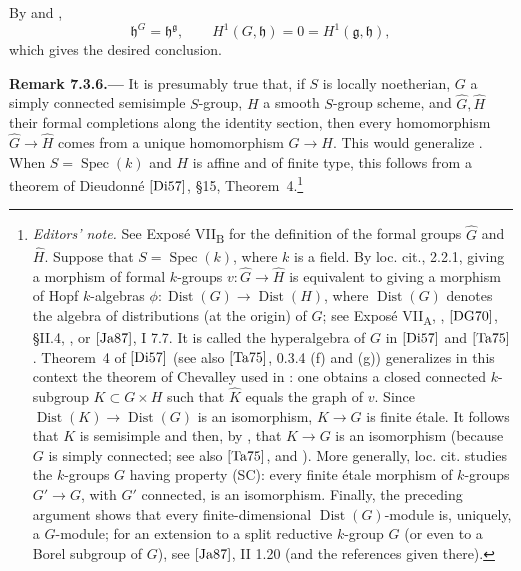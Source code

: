 By  and ,
\[
  \mathfrak h^G=\mathfrak h^{\mathfrak g},
  \qquad
  H^1(G,\mathfrak h)=0=H^1(\mathfrak g,\mathfrak h),
\]
which gives the desired conclusion.

\par\medskip\noindent{}\textbf{Remark 7.3.6.---}\enspace
It is presumably true that, if \(S\) is locally noetherian, \(G\) a
simply connected semisimple \(S\)-group, \(H\) a smooth \(S\)-group
scheme, and \(\widehat G,\widehat H\) their formal completions along
the identity section, then every homomorphism
\(\widehat G\to\widehat H\) comes from a unique homomorphism \(G\to H\).
This would generalize . When \(S=\operatorname{Spec}(k)\)
and \(H\) is affine and of finite type, this follows from a theorem of
Dieudonné \([{\rm Di57}]\), \S15, Theorem~4.\footnote{\textit{Editors'
note.} See Exposé VII\textsubscript{B} for the definition of the formal
groups \(\widehat G\) and \(\widehat H\). Suppose that
\(S=\operatorname{Spec}(k)\), where \(k\) is a field. By loc. cit.,
2.2.1, giving a morphism of formal \(k\)-groups
\(v:\widehat G\to\widehat H\) is equivalent to giving a morphism of
Hopf \(k\)-algebras
\(\phi:\operatorname{Dist}(G)\to\operatorname{Dist}(H)\), where
\(\operatorname{Dist}(G)\) denotes the algebra of distributions (at
the origin) of \(G\); see Exposé VII\textsubscript{A}, ,
\([{\rm DG70}]\), \S II.4, , or \([{\rm Ja87}]\), I 7.7. It is called
the hyperalgebra of \(G\) in \([{\rm Di57}]\) and \([{\rm Ta75}]\).
Theorem~4 of \([{\rm Di57}]\) (see also \([{\rm Ta75}]\), 0.3.4 (f)
and (g)) generalizes in this context the theorem of Chevalley used in
: one obtains a closed connected \(k\)-subgroup
\(K\subset G\times H\) such that \(\widehat K\) equals the graph of
\(v\). Since \(\operatorname{Dist}(K)\to\operatorname{Dist}(G)\) is an
isomorphism, \(K\to G\) is finite étale. It follows that \(K\) is
semisimple and then, by , that \(K\to G\) is an
isomorphism (because \(G\) is simply connected; see also
\([{\rm Ta75}]\),  and ). More generally, loc. cit. studies the
\(k\)-groups \(G\) having property \textup{(SC)}: every finite étale
morphism of \(k\)-groups \(G'\to G\), with \(G'\) connected, is an
isomorphism. Finally, the preceding argument shows that every
finite-dimensional \(\operatorname{Dist}(G)\)-module is, uniquely, a
\(G\)-module; for an extension to a split reductive \(k\)-group \(G\)
(or even to a Borel subgroup of \(G\)), see \([{\rm Ja87}]\), II 1.20
(and the references given there).}

